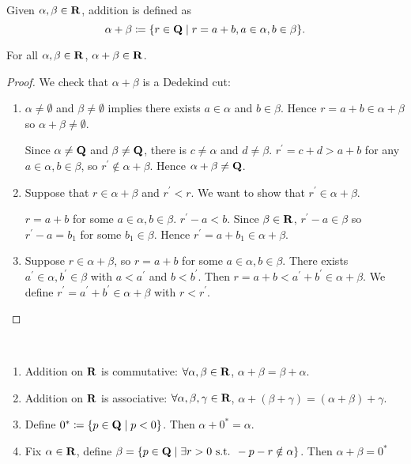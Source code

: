 \begin{definition*}[Addition]
Given $\alpha,\beta\in\mathbf R$, addition is defined as
\[\alpha+\beta\coloneqq\{r\in\mathbf Q\mid r=a+b,a\in\alpha,b\in\beta\}.\]
\end{definition*}

\begin{proposition*}
For all $\alpha,\beta\in\mathbf R$, $\alpha+\beta\in\mathbf R$.
\end{proposition*}

\begin{proof}
We check that $\alpha+\beta$ is a Dedekind cut:
\begin{enumerate}[label=(\roman*)]
\item $\alpha\neq\emptyset$ and $\beta\neq\emptyset$ implies there exists $a\in\alpha$ and $b\in\beta$. Hence $r=a+b\in\alpha+\beta$ so $\alpha+\beta\neq\emptyset$.

Since $\alpha\neq\mathbf Q$ and $\beta\neq\mathbf Q$, there is $c\neq\alpha$ and $d\neq\beta$. $r^\prime=c+d>a+b$ for any $a\in\alpha,b\in\beta$, so $r^\prime\notin\alpha+\beta$. Hence $\alpha+\beta\neq\mathbf Q$.

\item Suppose that $r\in\alpha+\beta$ and $r^\prime<r$. We want to show that $r^\prime\in\alpha+\beta$.

$r=a+b$ for some $a\in\alpha,b\in\beta$. $r^\prime-a<b$. Since $\beta\in\mathbf R$, $r^\prime-a\in\beta$ so $r^\prime-a=b_1$ for some $b_1\in\beta$. Hence $r^\prime=a+b_1\in\alpha+\beta$.

\item Suppose $r\in\alpha+\beta$, so $r=a+b$ for some $a\in\alpha,b\in\beta$. There exists $a^\prime\in\alpha,b^\prime\in\beta$ with $a<a^\prime$ and $b<b^\prime$. Then $r=a+b<a^\prime+b^\prime\in\alpha+\beta$. We define $r^\prime=a^\prime+b^\prime\in\alpha+\beta$ with $r<r^\prime$.
\end{enumerate}
\end{proof}

\begin{proposition*} \
\begin{enumerate}[label=(\roman*)]
\item Addition on $\mathbf R$ is commutative:
$\forall\alpha,\beta\in\mathbf R$, $\alpha+\beta=\beta+\alpha$.
\item Addition on $\mathbf R$ is associative:
$\forall\alpha,\beta,\gamma\in\mathbf R$, $\alpha+(\beta+\gamma)=(\alpha+\beta)+\gamma$.
\item Define $0^*\coloneqq\{p\in\mathbf Q\mid p<0\}$. Then $\alpha+0^*=\alpha$.
\item Fix $\alpha\in\mathbf R$, define $\beta=\{p\in\mathbf Q\mid\exists r>0\text{ s.t. }-p-r\notin\alpha\}$. Then $\alpha+\beta=0^*$
\end{enumerate}
\end{proposition*}

